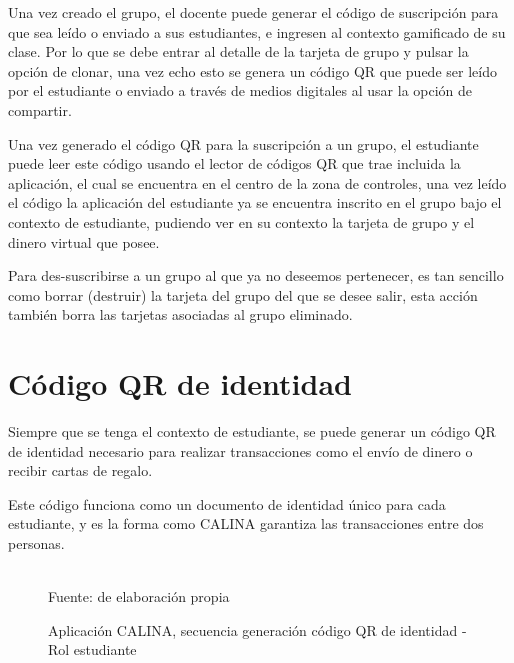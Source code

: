 Una vez creado el grupo, el docente puede generar el código de suscripción para que sea leído o enviado a sus 
estudiantes, e ingresen al contexto gamificado de su clase. Por lo que se debe entrar al detalle de la tarjeta 
de grupo y pulsar la opción de clonar, una vez echo esto se genera un código QR que puede ser leído por el 
estudiante o enviado a través de medios digitales al usar la opción de compartir.

Una vez generado el código QR para la suscripción a un grupo, el estudiante puede leer este código usando el 
lector de códigos QR que trae incluida la aplicación, el cual se encuentra en el centro de la zona de 
controles, una vez leído el código la aplicación del estudiante ya se encuentra inscrito en el grupo bajo el 
contexto de estudiante, pudiendo ver en su contexto la tarjeta de grupo y el dinero virtual que posee.

Para des-suscribirse a un grupo al que ya no deseemos pertenecer, es tan sencillo como borrar (destruir) la 
tarjeta del grupo del que se desee salir, esta acción también borra las tarjetas asociadas al grupo eliminado.

\section{Código QR de identidad}

Siempre que se tenga el contexto de estudiante, se puede generar un código QR de identidad necesario para 
realizar transacciones como el envío de dinero o recibir cartas de regalo.

Este código funciona como un documento de identidad único para cada estudiante, y es la forma como CALINA 
garantiza las transacciones entre dos personas.

\begin{figure}[!htb]
\caption[]{Aplicación CALINA, secuencia generación código QR de identidad - Rol estudiante}
\centering
\begin{adjustbox}{width=9cm}
\end{adjustbox}
\\
{\footnotesize Fuente: de elaboración propia}
\end{figure}

